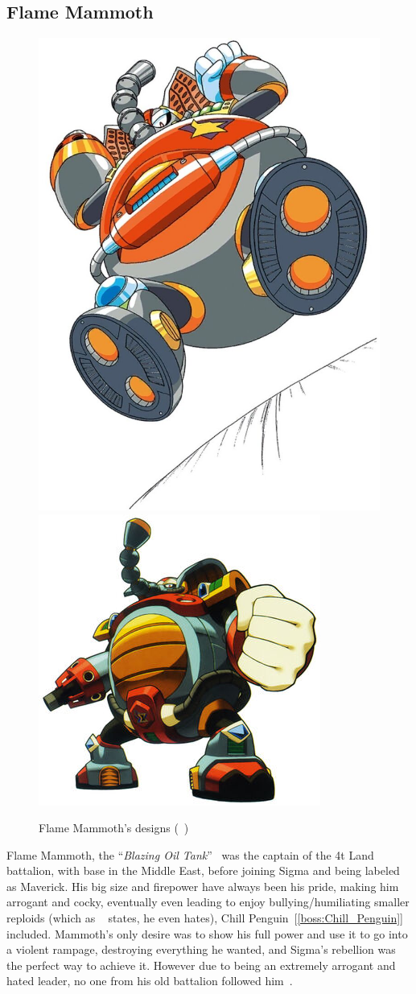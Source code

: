 \subsection{Flame Mammoth}\label{boss:Flame_mammoth}
\begin{figure}[htp]
	\centering
	\includegraphics[width=0.3\linewidth]{figures/X1/Flame_mammoth/Flame_mammoth.jpg}
	\includegraphics[width=0.4\linewidth]{figures/X1/Flame_mammoth/MHXFlameMammoth.jpg}
	\caption{Flame Mammoth's designs (~\cite{book:MMX_Complete_art})}
\end{figure}
Flame Mammoth, the ``\textit{Blazing Oil Tank}''~\cite{book:MMX_Complete_art} was the captain of the 4t Land battalion, with base in the Middle East, before joining Sigma and being labeled as Maverick. His big size and firepower have always been his pride, making him arrogant and cocky, eventually even leading to enjoy bullying/humiliating smaller reploids (which as ~\cite{wayback:X_resources} states, he even hates), Chill Penguin~[\ref{boss:Chill_Penguin}]~\cite{wiki:Flame_mammoth} included. Mammoth's only desire was to show his full power and use it to go into a violent rampage, destroying everything he wanted, and Sigma's rebellion was the perfect way to achieve it. However due to being an extremely arrogant and hated leader, no one from his old battalion followed him~\cite{MHX:manual}.

